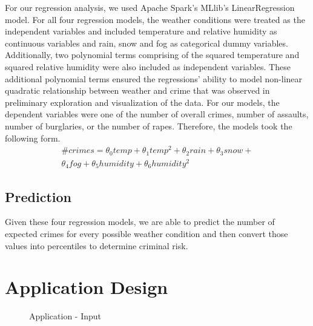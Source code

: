 \documentclass[conference]{IEEEtran}
\begin{document}
For our regression analysis, we used Apache Spark's MLlib's LinearRegression model.
For all four regression models, the weather conditions were treated as the independent variables and included temperature and relative humidity as continuous variables and rain, snow and fog as categorical dummy variables. 
Additionally, two polynomial terms comprising of the squared temperature  and squared relative humidity were also included as independent variables.
These additional polynomial terms ensured the regressions' ability to model non-linear quadratic relationship between weather and crime that was observed in preliminary exploration and visualization of the data.
For our models, the dependent variables were one of the number of overall crimes, number of assaults, number of burglaries, or the number of rapes.
Therefore, the models took the following form.
\begin{multline}\label{eq}
    \#crimes = \theta_{0}temp + \theta_{1}temp^{2} + \theta_{2}rain + \theta_{3}snow + \\
    \theta_{4}fog + \theta_{5}humidity + \theta_{6}humidity^{2}
\end{multline}

\subsection{Prediction}
Given these four regression models, we are able to predict the number of expected crimes for every possible weather condition and then convert those values into percentiles to determine criminal risk.

\section{Application Design}
\begin{figure}[htbp]
\centerline{}
\caption{Application - Input}
\label{design}
\end{figure}
\end{document}
